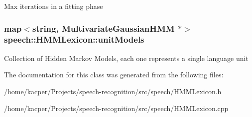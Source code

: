 Max iterations in a fitting phase \hypertarget{classspeech_1_1HMMLexicon_aee3322e49c63383316eb46e489d81de9}{
\subsubsection[{unit\+Models}]{\setlength{\rightskip}{0pt plus 5cm}map$<$string, {\bf Multivariate\+Gaussian\+H\+M\+M} $\ast$$>$ speech\+::\+H\+M\+M\+Lexicon\+::unit\+Models\hspace{0.3cm}{\ttfamily [protected]}}}\label{classspeech_1_1HMMLexicon_aee3322e49c63383316eb46e489d81de9}
Collection of Hidden Markov Models, each one represents a single language unit 

The documentation for this class was generated from the following files\+:\begin{DoxyCompactItemize}
\item 
/home/kacper/\+Projects/speech-\/recognition/src/speech/H\+M\+M\+Lexicon.\+h\item 
/home/kacper/\+Projects/speech-\/recognition/src/speech/H\+M\+M\+Lexicon.\+cpp\end{DoxyCompactItemize}
